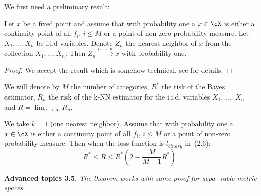We first need a preliminary result:

\begin{lemma}\label{lem:ch3-nearest}
Let $x$ be a fixed point and assume that with probability one a
$x \in \cX$ is either a continuity point of all $f_i$, $i \leq M$ or a point of non-zero
probability measure. Let $X_1, \ldots, X_n$ be i.i.d variables. Denote $Z_n$ the nearest
neighbor of $x$ from the collection $X_1, \ldots, X_n$. Then $Z_n \xrightarrow{n \to \infty} x$ with probability
one.
\end{lemma}

\begin{proof}
We accept the result which is somehow technical, see \cite[page 23]{turinici5} for
details.
\end{proof}

We will denote by $M$ the number of categories, $R^*$ the risk of the Bayes
estimator, $R_n$ the risk of the k-NN estimator for the i.i.d. variables $X_1, \ldots,$
$X_n$ and $R = \lim_{n \to \infty} R_n$.

\begin{theorem}\label{thm:ch3-cover}
We take $k = 1$ (one nearest neighbor). Assume that with
probability one a $x \in \cX$ is either a continuity point of all $f_i$, $i \leq M$ or a
point of non-zero probability measure. Then when the loss function is $l_{binary}$
in~(2.6):
\begin{equation}\label{eq:ch3-cover-bound}
R^* \leq R \leq R^* \left( 2 - \frac{M}{M-1} R^* \right).
\end{equation}
\end{theorem}

\begin{tcolorbox}[advancedbox]
\textbf{Advanced topics 3.5.} \textit{The theorem works with same proof for sepa-
rable metric spaces.}
\end{tcolorbox}


